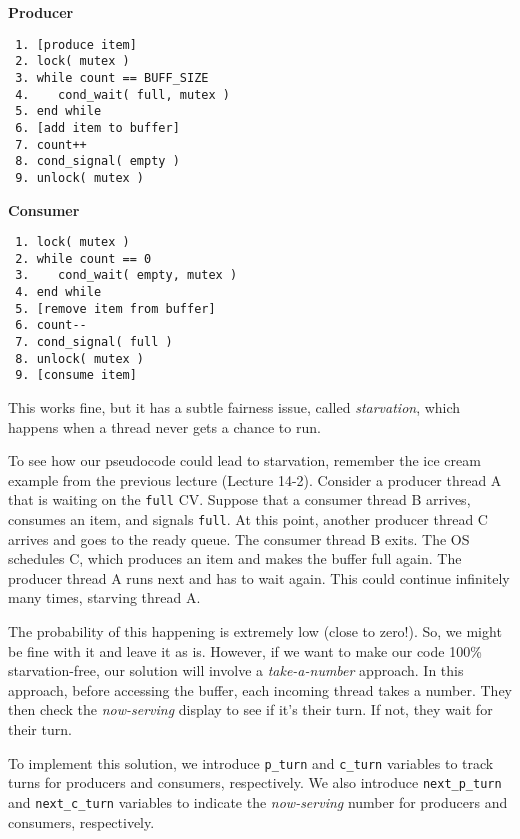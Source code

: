 \begin{multicols}{2}
    \small
    \textbf{Producer}\vspace{-2em}
    \begin{verbatim}
 1. [produce item]
 2. lock( mutex )
 3. while count == BUFF_SIZE
 4.    cond_wait( full, mutex )
 5. end while
 6. [add item to buffer]
 7. count++
 8. cond_signal( empty )
 9. unlock( mutex )
    \end{verbatim}
    \columnbreak
    \textbf{Consumer}\vspace{-2em}
    \begin{verbatim}
 1. lock( mutex )
 2. while count == 0
 3.    cond_wait( empty, mutex )
 4. end while
 5. [remove item from buffer]
 6. count--
 7. cond_signal( full )
 8. unlock( mutex )
 9. [consume item]
    \end{verbatim}
\end{multicols}
\vspace{-2em}

This works fine, but it has a subtle fairness issue, called \emph{starvation}, which happens when a thread never gets a chance to run.

To see how our pseudocode could lead to starvation, remember the ice cream example from the previous lecture (Lecture 14-2).
Consider a producer thread A that is waiting on the \texttt{full} CV.
Suppose that a consumer thread B arrives, consumes an item, and signals \texttt{full}.
At this point, another producer thread C arrives and goes to the ready queue.
The consumer thread B exits.
The OS schedules C, which produces an item and makes the buffer full again.
The producer thread A runs next and has to wait again.
This could continue infinitely many times, starving thread A.

The probability of this happening is extremely low (close to zero!).
So, we might be fine with it and leave it as is.
However, if we want to make our code 100\% starvation-free, our solution will involve a \emph{take-a-number} approach.
In this approach, before accessing the buffer, each incoming thread takes a number.
They then check the \emph{now-serving} display to see if it's their turn.
If not, they wait for their turn.

To implement this solution, we introduce \texttt{p\_turn} and \texttt{c\_turn} variables to track turns for producers and consumers, respectively.
We also introduce \texttt{next\_p\_turn} and \texttt{next\_c\_turn} variables to indicate the \emph{now-serving} number for producers and consumers, respectively.

